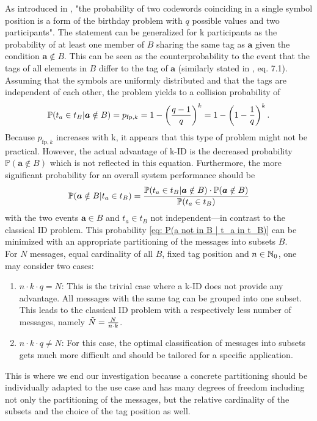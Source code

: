 \documentclass[english,BCOR=4mm,cdfont=false]{tudscrreprt} %
\begin{document}
As introduced in \cite{ID_Codes_Topical_Review}, "the probability of two codewords coinciding in a single symbol position is a form of the birthday problem with $q$ possible values and two participants". The statement can be generalized for k participants as the probability of at least one member of $B$ sharing the same tag as $\boldsymbol{a}$ given the condition $\boldsymbol{a} \notin B$. This can be seen as the counterprobability to the event that the tags of all elements in $B$ differ to the tag of $\boldsymbol{a}$ (similarly stated in \cite{diaconis_methods_1989}, eq. 7.1). 
Assuming that the symbols are uniformly distributed and that the tags are independent of each other, the problem yields to a collision probability of
\begin{equation}
    \mathbb{P}(t_a \in t_B | \boldsymbol{a} \notin B) = p_{\text{fp},k} = 1-\left(\frac{q-1}{q}\right)^k =  1-\left(1 - \frac{1}{q}\right)^k.\label{eq:fp prob kID}
\end{equation}
Because $p_{\text{fp},k} $ increases with k, it appears that this type of problem might not be practical. However, the actual advantage of k-ID is the decreased probability $ \mathbb{P}(\boldsymbol{a} \notin B)$ which is not reflected in this equation. 
Furthermore, the more significant probability for an overall system performance should be 
\begin{align}
    \mathbb{P}(\boldsymbol{a} \notin B | t_a \in t_B) = \frac{\mathbb{P}(t_a \in t_B | \boldsymbol{a} \notin B) \cdot \mathbb{P}(\boldsymbol{a} \notin B)}{ \mathbb{P}(t_a \in t_B)} \label{eq: P(a not in B | t_a in t_B)}
\end{align}
with the two events $\boldsymbol{a} \in B$ and $t_a \in t_B$ not independent---in contrast to the classical ID problem.
This probability \eqref{eq: P(a not in B | t_a in t_B)} can be minimized with an appropriate partitioning of the messages into subsets $B$.\\ 
For $N$ messages, equal cardinality of all $B$, fixed tag position and $n \in \mathbb{N}_0$, one may consider two cases:
\begin{enumerate}
    \item $n \cdot k \cdot q = N$: This is the trivial case where a k-ID does not provide any advantage. All messages with the same tag can be grouped into one subset. This leads to the classical ID problem with a respectively less number of messages, namely $\Tilde{N} = \frac{N}{n \cdot k}$.
    \item $n \cdot k \cdot q \neq N $: For this case, the optimal classification of messages into subsets gets much more difficult and should be tailored for a specific application.
\end{enumerate}
This is where we end our investigation because a concrete partitioning should be individually adapted to the use case and has many degrees of freedom including not only the partitioning of the messages, but the relative cardinality of the subsets and the choice of the tag position as well. 
\end{document}
